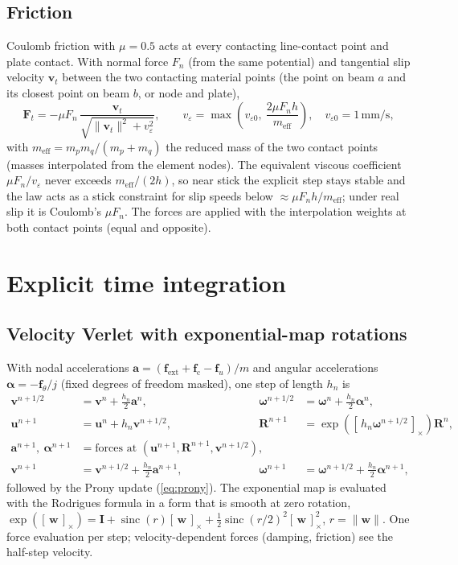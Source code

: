\documentclass[11pt,a4paper]{article}
\newcommand{\vect}[1]{\bm{#1}}
\newcommand{\mat}[1]{\mathbf{#1}}
\newcommand{\skw}[1]{[\,#1\,]_{\times}}
\begin{document}
\subsection{Friction}
Coulomb friction with $\mu = 0.5$ acts at every contacting line-contact point and plate contact. With normal
force $F_n$ (from the same potential) and tangential slip velocity $\vect v_t$ between the two contacting
material points (the point on beam $a$ and its closest point on beam $b$, or node and plate),
\begin{equation}
\vect F_t = -\mu F_n\,\frac{\vect v_t}{\sqrt{\lVert\vect v_t\rVert^2 + v_\varepsilon^2}},\qquad
v_\varepsilon = \max\!\left(v_{\varepsilon 0},\ \frac{2\mu F_n h}{m_\mathrm{eff}}\right),\quad v_{\varepsilon0} = 1\,\mathrm{mm/s},
\end{equation}
with $m_\mathrm{eff} = m_p m_q/(m_p+m_q)$ the reduced mass of the two contact points (masses interpolated from
the element nodes). The equivalent viscous coefficient $\mu F_n/v_\varepsilon$ never exceeds
$m_\mathrm{eff}/(2h)$, so near stick the explicit step stays stable and the law acts as a stick constraint for
slip speeds below $\approx\mu F_n h/m_\mathrm{eff}$; under real slip it is Coulomb's $\mu F_n$. The forces are
applied with the interpolation weights at both contact points (equal and opposite).

\section{Explicit time integration}
\label{sec:time}
\subsection{Velocity Verlet with exponential-map rotations}
With nodal accelerations $\vect a = (\vect f_\mathrm{ext}+\vect f_\mathrm{c}-\vect f_u)/m$ and angular
accelerations $\vect\alpha = -\vect f_\theta/j$ (fixed degrees of freedom masked), one step of length $h_n$ is
\begin{align}
\vect v^{n+1/2} &= \vect v^n + \tfrac{h_n}{2}\vect a^n, & \vect\omega^{n+1/2} &= \vect\omega^n + \tfrac{h_n}{2}\vect\alpha^n,\\
\vect u^{n+1} &= \vect u^n + h_n\vect v^{n+1/2}, & \mat R^{n+1} &= \exp\!\left(\skw{h_n\vect\omega^{n+1/2}}\right)\mat R^n,\\
\vect a^{n+1},\ \vect\alpha^{n+1} &= \text{forces at } (\vect u^{n+1}, \mat R^{n+1}, \vect v^{n+1/2}), &&\\
\vect v^{n+1} &= \vect v^{n+1/2} + \tfrac{h_n}{2}\vect a^{n+1}, & \vect\omega^{n+1} &= \vect\omega^{n+1/2} + \tfrac{h_n}{2}\vect\alpha^{n+1},
\end{align}
followed by the Prony update (\ref{eq:prony}). The exponential map is evaluated with the Rodrigues formula in a
form that is smooth at zero rotation,
$\exp(\skw{\vect w}) = \mat I + \operatorname{sinc}(r)\skw{\vect w} + \tfrac12\operatorname{sinc}(r/2)^2\skw{\vect w}^2$,
$r = \lVert\vect w\rVert$. One force evaluation per step; velocity-dependent forces (damping, friction) see
the half-step velocity.
\end{document}
